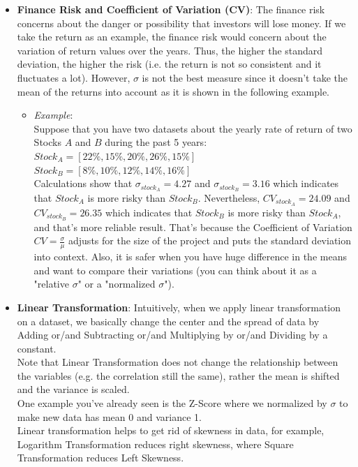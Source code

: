 \documentclass[11pt, twocolumn]{article}
\begin{document}
\begin{itemize}
\item \textbf{Finance Risk and Coefficient of Variation (CV)}:  
The finance risk concerns about the danger or possibility that investors will lose money. If we take the return as an example, the finance risk would concern about the variation of return values over the years. Thus, the higher the standard deviation, the higher the risk (i.e. the return is not so consistent and it fluctuates a lot). However, $\sigma$ is not the best measure since it doesn't take the mean of the returns into account as it is shown in the following example.
\begin{itemize}
\item \textit{Example}:\\
Suppose that you have two datasets about the yearly rate of return of two Stocks $A$ and $B$ during the past 5 years: \\
$Stock_A = [22\%, 15\%, 20\%, 26\%, 15\%]$ \\
$Stock_B = [8\%, 10\%, 12\%, 14\%, 16\%]$ \\
Calculations show that $\sigma_{stock_A} = 4.27$ and  $\sigma_{stock_B} = 3.16$ which indicates that $Stock_A$ is more risky than $Stock_B$. 
Nevertheless, $CV_{stock_A} = 24.09$ and  $CV_{stock_B} = 26.35$ which indicates that $Stock_B$ is more risky than $Stock_A$, and that's more reliable result. That's because the Coefficient of Variation $CV = \frac{\sigma}{\mu}$ adjusts for the size of the project and puts the standard deviation into {\color{blue} context}. Also, it is {\color{blue} safer} when you have huge difference in the means and want to compare their variations (you can think about it as a "relative $\sigma$" or a "normalized $\sigma$").
\end{itemize}
\end{itemize}

\begin{itemize}
\item \textbf{Linear Transformation}:  
Intuitively, when we apply linear transformation on a dataset, we basically change the center and the spread of data by Adding or/and Subtracting or/and Multiplying by or/and
Dividing by a {\color{blue} constant}.\\
Note that Linear Transformation does {\color{red} not} change the relationship between the variables (e.g. the correlation still the same), rather the mean is shifted and the variance is scaled.\\
One example you've already seen is the Z-Score where we normalized by $\sigma$ to make new data has mean 0 and variance 1.\\
Linear transformation helps to get rid of skewness in data, for example, Logarithm Transformation reduces right skewness, where Square Transformation reduces Left Skewness.


\end{itemize}
\end{document}
